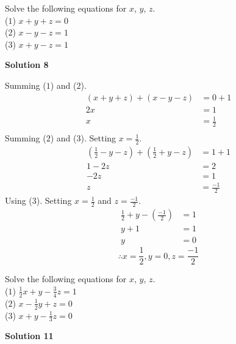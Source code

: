 \documentclass[6pt]{article}
\begin{document}
\begin{tcolorbox}[title=Problem 8, breakable]
    Solve the following equations for $x$, $y$, $z$. \\
    ($1$) $x + y + z = 0$ \\
    ($2$) $x - y - z = 1$ \\
    ($3$) $x + y - z = 1$
\end{tcolorbox}

\textbf{Solution 8}

Summing ($1$) and ($2$).
\begin{align*}
    (x + y + z) + (x - y - z) &= 0 + 1 \\
    2x &= 1 \\
    x &= \frac{1}{2} \\
\end{align*}
Summing ($2$) and ($3$). Setting $x = \frac{1}{2}$.
\begin{align*}
    (\frac{1}{2} - y - z) + (\frac{1}{2} + y - z) &= 1 + 1 \\
    1 - 2z &= 2 \\
    -2z &= 1 \\
    z &= \frac{-1}{2} 
\end{align*}
Using ($3$). Setting $x = \frac{1}{2}$ and $z = \frac{-1}{2}$.
\begin{align*}
    \frac{1}{2} + y - (\frac{-1}{2}) &= 1 \\
    y + 1 &= 1 \\
    y &= 0
\end{align*}
\[\therefore x = \frac{1}{2}, y = 0, z = \frac{-1}{2} \]

\begin{tcolorbox}[title=Problem 11, breakable]
    Solve the following equations for $x$, $y$, $z$. \\
    ($1$) $\frac{1}{2}x + y - \frac{3}{4}z = 1$ \\
    ($2$) $x - \frac{1}{2}y + z = 0$ \\
    ($3$) $x + y - \frac{1}{3}z = 0$
\end{tcolorbox}

\textbf{Solution 11}
\end{document}
